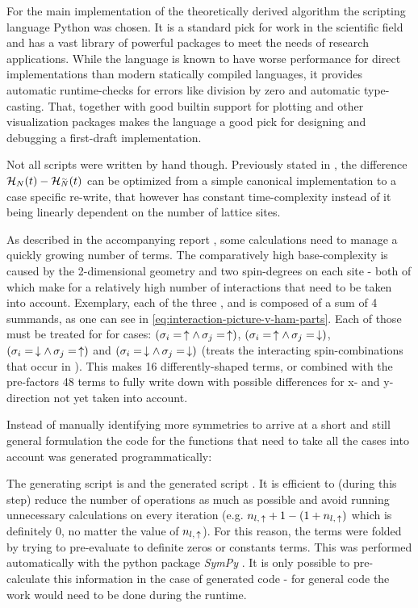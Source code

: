 For the main implementation of the theoretically derived algorithm the scripting language Python was chosen.
It is a standard pick for work in the scientific field and has a vast library of powerful packages to meet the needs of research applications.
While the language is known to have worse performance for direct implementations than modern statically compiled languages, it provides automatic runtime-checks for errors like division by zero and automatic type-casting.
That, together with good builtin support for plotting and other visualization packages makes the language a good pick for designing and debugging a first-draft implementation.

Not all scripts were written by hand though.
Previously stated in , the difference $\HNOft - \HNOft[\vphantom{N}\smash{\tilde{N}}]$ can be optimized from a simple canonical implementation to a case specific re-write, that however has constant time-complexity instead of it being linearly dependent on the number of lattice sites.

As described in the accompanying report , some calculations need to manage a quickly growing number of terms.
The comparatively high base-complexity is caused by the 2-dimensional geometry and two spin-degrees on each site - both of which make for a relatively high number of interactions that need to be taken into account.
Exemplary, each of the three ,  and  is composed of a sum of 4 summands, as one can see in \autoref{eq:interaction-picture-v-ham-parts}.
Each of those must be treated for for cases: $(\sigma_i = \,\uparrow \land \,\sigma_j = \,\uparrow)$, $(\sigma_i = \,\uparrow \land \,\sigma_j = \,\downarrow)$, $(\sigma_i = \,\downarrow \land \,\sigma_j = \,\uparrow)$ and $(\sigma_i = \,\downarrow \land \,\sigma_j = \,\downarrow)$ (treats the interacting spin-combinations that occur in ).
This makes 16 differently-shaped terms, or combined with the pre-factors 48 terms to fully write down with possible differences for x- and y-direction not yet taken into account.

Instead of manually identifying more symmetries to arrive at a short and still general formulation the code for the functions that need to take all the cases into account was generated programmatically:

The generating script is  and the generated script .
It is efficient to (during this step) reduce the number of operations as much as possible and avoid running unnecessary calculations on every iteration (e.g. $n_{l,\,\uparrow} + 1 - (1 + n_{l,\,\uparrow})$ which is definitely 0, no matter the value of $n_{l,\,\uparrow}$).
For this reason, the terms were folded by trying to pre-evaluate to definite zeros or constants terms.
This was performed automatically with the python package \emph{SymPy} \cite{sympyPackage}.
It is only possible to pre-calculate this information in the case of generated code - for general code the work would need to be done during the runtime.
